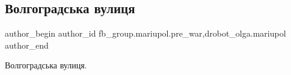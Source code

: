  
 
 
 
 

\subsection{Волгоградська вулиця}
\label{sec:04_03_2023.fb.fb_group.mariupol.pre_war.2.volgogradska_vulitsy}
 
\ifcmt
 author_begin
   author_id fb_group.mariupol.pre_war,drobot_olga.mariupol
 author_end
\fi

Волгоградська вулиця.

